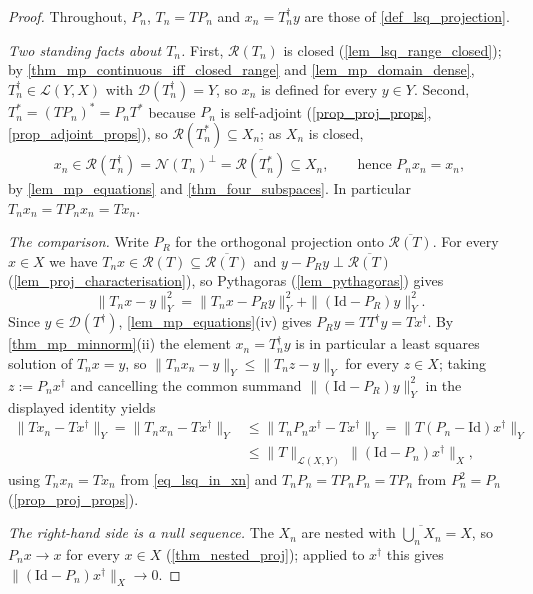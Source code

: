 \documentclass[a4paper]{report}
\theoremstyle{plain}
\theoremstyle{definition}
\theoremstyle{remark}
\newcommand{\Ll}{\mathcal{L}}
\newcommand{\Ran}{\mathcal{R}}
\newcommand{\Ker}{\mathcal{N}}
\newcommand{\Dom}{\mathcal{D}}
\newcommand{\Id}{\mathrm{Id}}
\newcommand{\dg}{^{\dagger}}
\begin{document}
\begin{proof}
  Throughout, $P_n$, $T_n = TP_n$ and $x_n = T_n\dg y$ are those of
  \cref{def_lsq_projection}.

  \emph{Two standing facts about $T_n$.}  First, $\Ran(T_n)$ is closed
  (\cref{lem_lsq_range_closed}); by \cref{thm_mp_continuous_iff_closed_range} and
  \cref{lem_mp_domain_dense}, $T_n\dg \in \Ll(Y,X)$ with $\Dom(T_n\dg) = Y$, so $x_n$ is
  defined for every $y \in Y$.  Second, $T_n^{*} = (TP_n)^{*} = P_nT^{*}$ because $P_n$ is
  self-adjoint (\cref{prop_proj_props}, \cref{prop_adjoint_props}), so
  $\Ran(T_n^{*}) \subseteq X_n$; as $X_n$ is closed,
  \begin{equation}\label{eq_lsq_in_xn}
    x_n \in \Ran(T_n\dg) = \Ker(T_n)^{\perp} = \overline{\Ran(T_n^{*})} \subseteq X_n ,
    \qquad\text{hence } P_nx_n = x_n ,
  \end{equation}
  by \cref{lem_mp_equations} and \cref{thm_four_subspaces}.  In particular
  $T_nx_n = TP_nx_n = Tx_n$.

  \emph{The comparison.}  Write $P_R$ for the orthogonal projection onto
  $\overline{\Ran(T)}$.  For every $x \in X$ we have $T_nx \in \Ran(T) \subseteq
  \overline{\Ran(T)}$ and $y - P_Ry \perp \overline{\Ran(T)}$
  (\cref{lem_proj_characterisation}), so Pythagoras (\cref{lem_pythagoras}) gives
  \[
    \|T_nx - y\|_Y^{2} = \|T_nx - P_Ry\|_Y^{2} + \|(\Id - P_R)y\|_Y^{2} .
  \]
  Since $y \in \Dom(T\dg)$, \cref{lem_mp_equations}(iv) gives $P_Ry = TT\dg y = Tx\dg$.
  By \cref{thm_mp_minnorm}(ii) the element $x_n = T_n\dg y$ is in particular a least
  squares solution of $T_nx = y$, so $\|T_nx_n - y\|_Y \le \|T_nz - y\|_Y$ for every
  $z \in X$; taking $z := P_nx\dg$ and cancelling the common summand
  $\|(\Id-P_R)y\|_Y^{2}$ in the displayed identity yields
  \[
    \begin{aligned}
      \|Tx_n - Tx\dg\|_Y = \|T_nx_n - Tx\dg\|_Y
        &\le \|T_nP_nx\dg - Tx\dg\|_Y = \|T(P_n - \Id)x\dg\|_Y \\
        &\le \|T\|_{\Ll(X,Y)}\,\|(\Id - P_n)x\dg\|_X ,
    \end{aligned}
  \]
  using $T_nx_n = Tx_n$ from \eqref{eq_lsq_in_xn} and $T_nP_n = TP_nP_n = TP_n$ from
  $P_n^{2} = P_n$ (\cref{prop_proj_props}).

  \emph{The right-hand side is a null sequence.}  The $X_n$ are nested with
  $\overline{\bigcup_n X_n} = X$, so $P_nx \to x$ for every $x \in X$
  (\cref{thm_nested_proj}); applied to $x\dg$ this gives
  $\|(\Id - P_n)x\dg\|_X \to 0$.
\end{proof}
\end{document}

